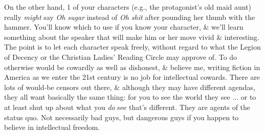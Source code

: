 \documentclass{article}
\numberwithin{equation}{section}
\begin{document}
On the other hand, 1 of your characters (e.g., the protagonist's old maid aunt) really \textit{might} say \textit{Oh sugar} instead of \textit{Oh shit} after pounding her thumb with the hammer. You'll know which to use if you know your character, \& we'll learn something about the speaker that will make him or her move vivid \& interesting. The point is to let each character speak freely, without regard to what the Legion of Decency or the Christian Ladies' Reading Circle may approve of. To do otherwise would be cowardly as well as dishonest, \& believe me, writing fiction in America as we enter the 21st century is no job for intellectual cowards. There are lots of would-be censors out there, \& although they may have different agendas, they all want basically the same thing: for you to see the world they see $\ldots$ or to at least shut up about what you \textit{do} see that's different. They are agents of the status quo. Not necessarily bad guys, but dangerous guys if you happen to believe in intellectual freedom.
\end{document}
